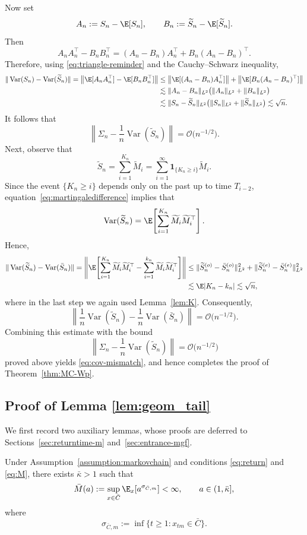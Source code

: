 \documentclass[mnsc,nonblindrev]{informs3}
\begin{document}
Now set
\[
A_n := S_n - \E[S_n],
\qquad
B_n := \widetilde S_n - \E[\widetilde S_n].
\]
Then
\[
A_nA_n^\top - B_nB_n^\top
=
(A_n-B_n)A_n^\top + B_n(A_n-B_n)^\top.
\]
Therefore, using \eqref{eq:triangle-reminder} and the Cauchy--Schwarz
inequality,
\begin{align*}
\|\operatorname{Var}(S_n) - \operatorname{Var}(\widetilde S_n)\|
=
\bigl\|\E[A_nA_n^\top] - \E[B_nB_n^\top]\bigr\| &\le
\bigl\|\E[(A_n-B_n)A_n^\top]\bigr\|
+
\bigl\|\E[B_n(A_n-B_n)^\top]\bigr\| \\
&\lesssim
\|A_n-B_n\|_{L^2}\bigl(\|A_n\|_{L^2}+\|B_n\|_{L^2}\bigr) \\
&\lesssim
\|S_n-\widetilde S_n\|_{L^2}
\bigl(\|S_n\|_{L^2}+\|\widetilde S_n\|_{L^2}\bigr) \lesssim \sqrt n.
\end{align*}
It follows that
\[
\left\|
\Sigma_n - \frac{1}{n}\operatorname{Var}(\widetilde S_n)
\right\|
= \mathcal O\bigl(n^{-1/2}\bigr).
\]
Next, observe that
\[
\widetilde S_n
=
\sum_{i=1}^{K_n}\widetilde M_i
=
\sum_{i=1}^{\infty}\mathbf{1}_{\{K_n\ge i\}}\widetilde M_i.
\]
Since the event \(\{K_n \ge i\}\) depends only on the past up to time
\(T_{i-2}\), equation~\eqref{eq:martingaledifference} implies that
\[
\operatorname{Var}(\widetilde S_n)
=
\E\!\left[\sum_{i=1}^{K_n}\widetilde M_i\widetilde M_i^\top\right].
\]
Hence,
\begin{align*}
\|\operatorname{Var}(\widetilde S_n)-\operatorname{Var}(\bar S_n)\|
=
\left\|
\E\!\left[
\sum_{i=1}^{K_n}\widetilde M_i\widetilde M_i^\top
-
\sum_{i=1}^{k_n}\widetilde M_i\widetilde M_i^\top
\right]
\right\| &\le
\|\widetilde S_n^{(o)}-\bar S_n^{(o)}\|_{L^2}^2
+
\|\widetilde S_n^{(e)}-\bar S_n^{(e)}\|_{L^2}^2 \\
&\lesssim \E|K_n-k_n|
\lesssim \sqrt n,
\end{align*}
where in the last step we again used Lemma~\ref{lem:K}. Consequently,
\[
\left\|
\frac{1}{n}\operatorname{Var}(\widetilde S_n)
-
\frac{1}{n}\operatorname{Var}(\bar S_n)
\right\|
=
\mathcal O\bigl(n^{-1/2}\bigr).
\]
Combining this estimate with the bound
\[
\left\|
\Sigma_n - \frac{1}{n}\operatorname{Var}(\widetilde S_n)
\right\|
=
\mathcal O\bigl(n^{-1/2}\bigr)
\]
proved above yields \eqref{eq:cov-mismatch}, and hence completes the proof of
Theorem~\ref{thm:MC-Wp}.





\subsection{Proof of Lemma \ref{lem:geom_tail}}\label{sec:geom_tail}
We first record two auxiliary lemmas, whose proofs are deferred to Sections~\ref{sec:returntime-m} and~\ref{sec:entrance-mgf}.
\begin{lemma}\label{lem:returntime-m}
Under Assumption~\ref{assumption:markovchain} and conditions \eqref{eq:return}
and \eqref{eq:M}, there exists \(\bar\kappa>1\) such that
\[
\bar M(a):=\sup_{x\in\bar C}\E_x\!\left[a^{\sigma_{\bar C,m}}\right]<\infty,
\qquad a\in(1,\bar\kappa],
\]
where
\[
\sigma_{\bar C,m}:=\inf\{t\ge1:x_{tm}\in\bar C\}.
\]
\end{lemma}
\end{document}
